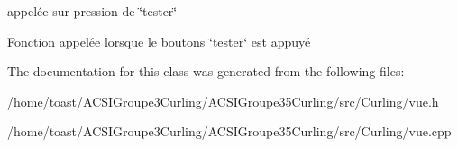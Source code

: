 appelée sur pression de \char`\"{}tester\char`\"{} 

Fonction appelée lorsque le boutons \char`\"{}tester\char`\"{} est appuyé 

The documentation for this class was generated from the following files\-:\begin{DoxyCompactItemize}
\item 
/home/toast/\-A\-C\-S\-I\-Groupe3\-Curling/\-A\-C\-S\-I\-Groupe35\-Curling/src/\-Curling/\hyperlink{vue_8h}{vue.\-h}\item 
/home/toast/\-A\-C\-S\-I\-Groupe3\-Curling/\-A\-C\-S\-I\-Groupe35\-Curling/src/\-Curling/vue.\-cpp\end{DoxyCompactItemize}

